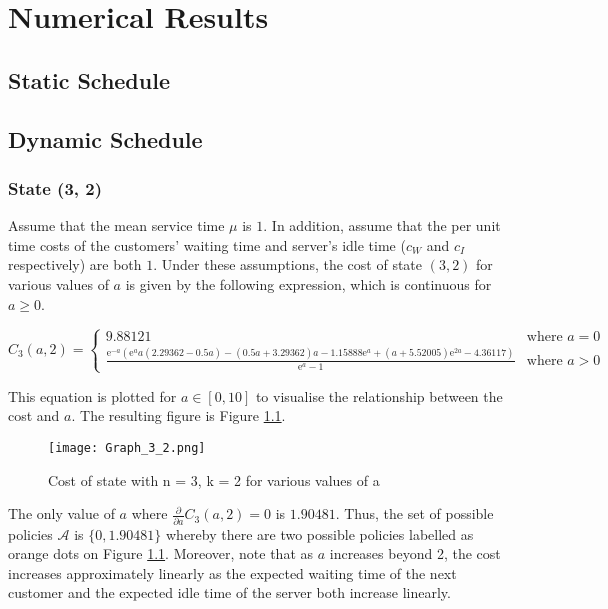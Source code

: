 \chapter{Numerical Results}

\section{Static Schedule}

\section{Dynamic Schedule}

\subsection{State (3, 2)}

Assume that the mean service time $\mu$ is $1$. In addition, assume that the per unit time costs of the customers' waiting time and server's idle time ($c_{W}$ and $c_{I}$ respectively) are both $1$. Under these assumptions, the cost of state $(3, 2)$ for various values of $a$ is given by the following expression, which is continuous for $a \geq 0$.

\begin{equation*}
	C_{3} (a, 2) =
	\begin{cases}
 		9.88121 & \text{where $a = 0$} \\
 		\frac{\mathrm{e}^{-a} \left( \mathrm{e}^{a} a (2.29362 - 0.5 a) - (0.5 a + 3.29362) a - 1.15888 \mathrm{e}^{a} + (a + 5.52005) \mathrm{e}^{2 a} - 4.36117 \right)}{\mathrm{e}^{a} - 1} & \text{where $a > 0$}
	\end{cases}
\end{equation*}

This equation is plotted for $a \in [0, 10]$ to visualise the relationship between the cost and $a$. The resulting figure is Figure \ref{Graph_3_2}.

\begin{figure}[htb]
	\centering
	\texttt{[image: Graph\_3\_2.png]}
	\caption{Cost of state with n = 3, k = 2 for various values of a}
	\label{Graph_3_2}
\end{figure}

The only value of $a$ where $\frac{\partial}{\partial a} C_{3} (a, 2) = 0$ is $1.90481$. Thus, the set of possible policies $\mathcal{A}$ is $\{ 0, 1.90481 \}$ whereby there are two possible policies labelled as orange dots on Figure \ref{Graph_3_2}. Moreover, note that as $a$ increases beyond 2, the cost increases approximately linearly as the expected waiting time of the next customer and the expected idle time of the server both increase linearly.

